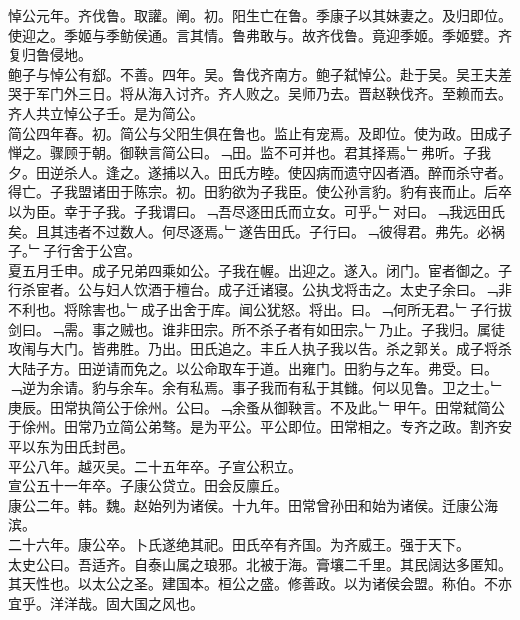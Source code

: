 \documentclass{zhvt-classic}
\begin{document}
\hspace*{2em}悼公元年。齐伐鲁。取讙。阐。初。阳生亡在鲁。季康子以其妹妻之。及归即位。使迎之。季姬与季鲂侯通。言其情。鲁弗敢与。故齐伐鲁。竟迎季姬。季姬嬖。齐复归鲁侵地。\\
\hspace*{2em}鲍子与悼公有郄。不善。四年。吴。鲁伐齐南方。鲍子弑悼公。赴于吴。吴王夫差哭于军门外三日。将从海入讨齐。齐人败之。吴师乃去。晋赵鞅伐齐。至赖而去。齐人共立悼公子壬。是为简公。\\
\hspace*{2em}简公四年春。初。简公与父阳生俱在鲁也。监止有宠焉。及即位。使为政。田成子惮之。骤顾于朝。御鞅言简公曰。﹁田。监不可并也。君其择焉。﹂弗听。子我夕。田逆杀人。逢之。遂捕以入。田氏方睦。使囚病而遗守囚者酒。醉而杀守者。得亡。子我盟诸田于陈宗。初。田豹欲为子我臣。使公孙言豹。豹有丧而止。后卒以为臣。幸于子我。子我谓曰。﹁吾尽逐田氏而立女。可乎。﹂对曰。﹁我远田氏矣。且其违者不过数人。何尽逐焉。﹂遂告田氏。子行曰。﹁彼得君。弗先。必祸子。﹂子行舍于公宫。\\
\hspace*{2em}夏五月壬申。成子兄弟四乘如公。子我在幄。出迎之。遂入。闭门。宦者御之。子行杀宦者。公与妇人饮酒于檀台。成子迁诸寝。公执戈将击之。太史子余曰。﹁非不利也。将除害也。﹂成子出舍于库。闻公犹怒。将出。曰。﹁何所无君。﹂子行拔剑曰。﹁需。事之贼也。谁非田宗。所不杀子者有如田宗。﹂乃止。子我归。属徒攻闱与大门。皆弗胜。乃出。田氏追之。丰丘人执子我以告。杀之郭关。成子将杀大陆子方。田逆请而免之。以公命取车于道。出雍门。田豹与之车。弗受。曰。﹁逆为余请。豹与余车。余有私焉。事子我而有私于其雠。何以见鲁。卫之士。﹂\\
\hspace*{2em}庚辰。田常执简公于俆州。公曰。﹁余蚤从御鞅言。不及此。﹂甲午。田常弑简公于俆州。田常乃立简公弟骜。是为平公。平公即位。田常相之。专齐之政。割齐安平以东为田氏封邑。\\
\hspace*{2em}平公八年。越灭吴。二十五年卒。子宣公积立。\\
\hspace*{2em}宣公五十一年卒。子康公贷立。田会反廪丘。\\
\hspace*{2em}康公二年。韩。魏。赵始列为诸侯。十九年。田常曾孙田和始为诸侯。迁康公海滨。\\
\hspace*{2em}二十六年。康公卒。卜氏遂绝其祀。田氏卒有齐国。为齐威王。强于天下。\\
\hspace*{2em}太史公曰。吾适齐。自泰山属之琅邪。北被于海。膏壤二千里。其民阔达多匿知。其天性也。以太公之圣。建国本。桓公之盛。修善政。以为诸侯会盟。称伯。不亦宜乎。洋洋哉。固大国之风也。\\
\end{document}
